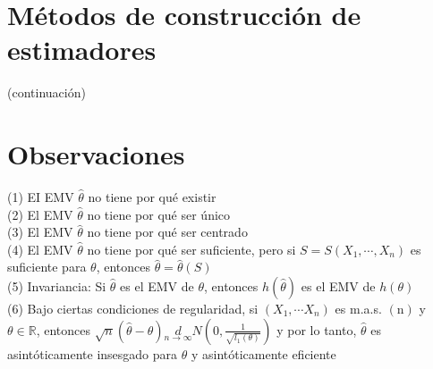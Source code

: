 \section*{Métodos de construcción de estimadores}
 (continuación)

\section*{Observaciones}
 (1) EI EMV $\hat{\theta}$ no tiene por qué existir\\
(2) El EMV $\hat{\theta}$ no tiene por qué ser único\\
(3) El EMV $\hat{\theta}$ no tiene por qué ser centrado\\
(4) El EMV $\hat{\theta}$ no tiene por qué ser suficiente, pero si $S=S\left(X_{1}, \cdots, X_{n}\right)$ es suficiente para $\theta$, entonces $\hat{\theta}=\hat{\theta}(S)$\\
(5) Invariancia: Si $\hat{\theta}$ es el EMV de $\theta$, entonces $h(\hat{\theta})$ es el EMV de $h(\theta)$\\
(6) Bajo ciertas condiciones de regularidad, si $\left(X_{1}, \cdots X_{n}\right)$ es m.a.s. $(\mathrm{n})$ y $\theta \in \mathbb{R}$, entonces $\sqrt{n}(\hat{\theta}-\theta) \underset{n \rightarrow \infty}{d} N\left(0, \frac{1}{\sqrt{l_{1}(\theta)}}\right)$ y por lo tanto, $\hat{\theta}$ es asintóticamente insesgado para $\theta$ y asintóticamente eficiente
